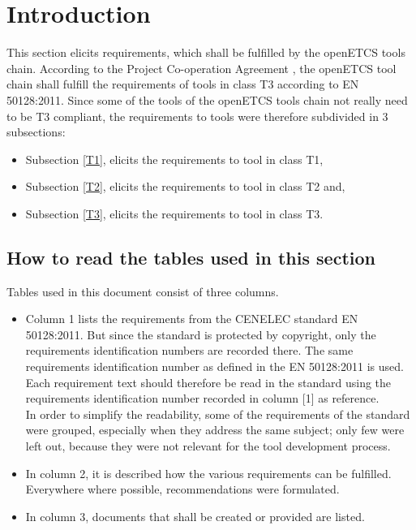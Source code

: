 \documentclass{template/openetcs_report}
\begin{document}
\section{Introduction}
This section elicits requirements, which shall be fulfilled by the openETCS tools chain.
According to the Project Co-operation Agreement \cite{PCA12}, the openETCS tool chain shall fulfill the requirements of tools in class T3 according to EN 50128:2011. Since some of the tools of the openETCS tools chain not really need to be T3 compliant, the requirements to tools were therefore subdivided in 3 subsections:
\begin{itemize}\itemsep=0pt
  \item Subsection \ref{T1}, elicits the requirements to tool in class T1,
  \item Subsection \ref{T2}, elicits the requirements to tool in class T2 and,
  \item Subsection \ref{T3}, elicits the requirements to tool in class T3.
\end{itemize}

\subsection{How to read the tables used in this section}
Tables used in this document consist of three columns.
\begin{itemize}\itemsep=0pt
  \item Column 1 lists the requirements from the CENELEC standard EN 50128:2011. But since the standard is protected by copyright, only the requirements identification numbers are recorded there. The same requirements identification number as defined in the EN 50128:2011 is used. Each requirement text should therefore be read in the standard using the requirements identification number recorded in column [1] as reference.\\
In order to simplify the readability, some of the requirements of the standard were grouped, especially when they address the same subject; only few were left out, because they were not relevant for the tool development process.
  \item In column 2, it is described how the various requirements can be fulfilled. Everywhere where possible, recommendations were formulated.
  \item In column 3, documents that shall be created or provided are listed.
\end{itemize}

\end{document}
